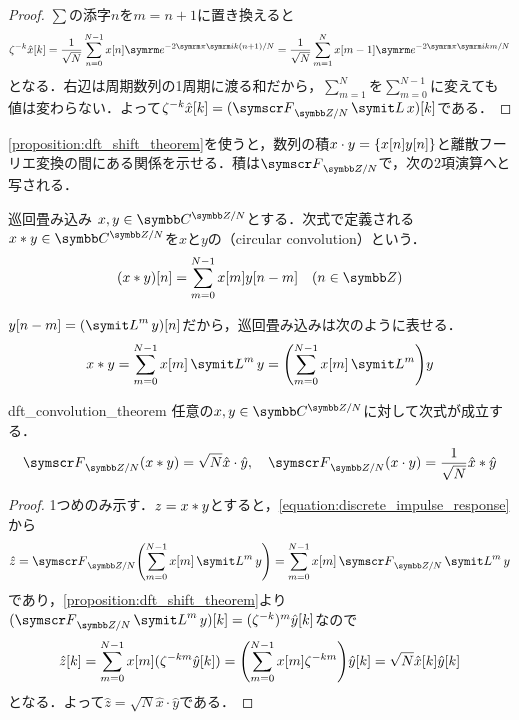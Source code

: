 \documentclass[../../main]{subfiles}
\begin{document}
\begin{proof}
  \(\sum\)の添字\(n\)を\(m=n+1\)に置き換えると
  \[
    \zeta^{-k}\hat{x}[k] = \frac{1}{\sqrt{N}}\sum_{n=0}^{N-1}x[n]\napr^{-2\krez\iuni k(n+1)/N}
    = \frac{1}{\sqrt{N}}\sum_{m=1}^Nx[m-1]\napr^{-2\krez\iuni km/N}
  \]
  となる．右辺は周期数列の1周期に渡る和だから，\(\sum_{m=1}^N\)を\(\sum_{m=0}^{N-1}\)に変えても値は変わらない．よって\(\zeta^{-k}\hat{x}[k]=(\dft{N}\lagop x)[k]\)である．
\end{proof}

\cref{proposition:dft_shift_theorem}を使うと，数列の積\(x\cdot y=\lbrace x[n]y[n]\rbrace\)と離散フーリエ変換の間にある関係を示せる．積は\(\dft{N}\)で，次の2項演算へと写される．

\begin{definition}{巡回畳み込み}{}
  \(x,y\in\cycles{\numset{C}}{N}\)とする．次式で定義される\(x\circconv y\in\cycles{\numset{C}}{N}\)を\(x\)と\(y\)の（circular convolution）という．
  \[
    (x\circconv y)[n] = \sum_{m=0}^{N-1}x[m]y[n-m]\quad(n\in\numset{Z})
  \]
\end{definition}

\(y[n-m]=(\lagop^my)[n]\)だから，巡回畳み込みは次のように表せる．
\begin{equation}
  \label{equation:discrete_impulse_response}
  x\circconv y = \sum_{m=0}^{N-1}x[m]\lagop^my
  = \pqty*{\sum_{m=0}^{N-1}x[m]\lagop^m}y
\end{equation}

\begin{proposition}{}{dft_convolution_theorem}
  任意の\(x,y\in\cycles{\numset{C}}{N}\)に対して次式が成立する．
  \[
    \dft{N}(x\circconv y) = \sqrt{N}\hat{x}\cdot\hat{y},
    \quad\dft{N}(x\cdot y) = \frac{1}{\sqrt{N}}\hat{x}\circconv\hat{y}
  \]
\end{proposition}

\begin{proof}
  1つめのみ示す．\(z=x\ast y\)とすると，\cref{equation:discrete_impulse_response}から
  \[
    \hat{z} = \dft{N}\pqty*{\sum_{m=0}^{N-1}x[m]\lagop^my}
    = \sum_{m=0}^{N-1}x[m]\dft{N}\lagop^my
  \]
  であり，\cref{proposition:dft_shift_theorem}より\((\dft{N}\lagop^my)[k]=(\zeta^{-k})^m\hat{y}[k]\)なので
  \[
    \hat{z}[k] = \sum_{m=0}^{N-1}x[m](\zeta^{-km}\hat{y}[k])
    = \pqty*{\sum_{m=0}^{N-1}x[m]\zeta^{-km}}\hat{y}[k]
    = \sqrt{N}\hat{x}[k]\hat{y}[k]
  \]
  となる．よって\(\hat{z}=\sqrt{N}\hat{x}\cdot\hat{y}\)である．
\end{proof}
\end{document}
